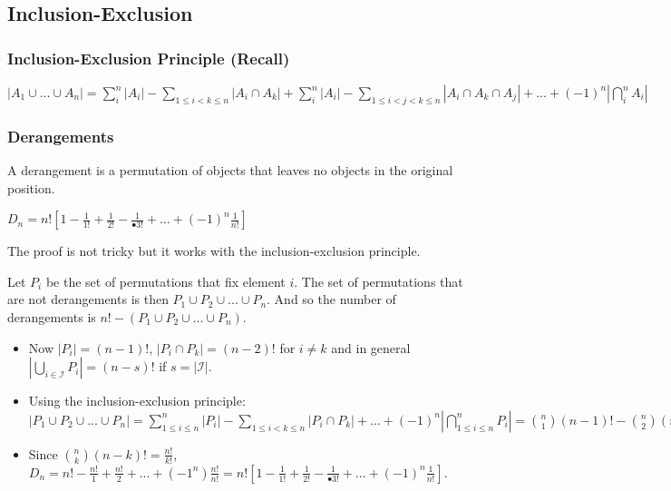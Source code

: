 \documentclass{article}
\begin{document}
\subsection{Inclusion-Exclusion}
\subsubsection{Inclusion-Exclusion Principle (Recall)}
\begin{tcolorbox}[sharp corners, colback=green!30, colframe=green!80!blue, title=Inclusion-Exclusion Principle] 
$ |A_1 \cup ... \cup A_n| = \sum_{i}^{n}|A_i| - \sum_{1 \leq i < k \leq n}|A_i \cap A_k| + \sum_{i}^{n}|A_i| - \sum_{1 \leq i < j < k \leq n}|A_i \cap A_k \cap A_j| + ... + (-1)^n |\bigcap\limits_{i}^{n}A_i| $
\end{tcolorbox}

\subsubsection{Derangements} A derangement is a permutation of objects that leaves no objects in the original position.

\begin{tcolorbox}[sharp corners, colback=green!30, colframe=green!80!blue, title=Number of Derangements with n elements]
$ D_n = n![1 - \frac{1}{1!} + \frac{1}{2!} - \frac{1}{•3!} + ... + (-1)^n\frac{1}{n!}] $
\end{tcolorbox}
The proof is not tricky but it works with the inclusion-exclusion principle.

\begin{tcolorbox}[width=12.1cm]
Let $ P_i $ be the set of permutations that fix element $ i $. The set of permutations that are not derangements is then $ P_1 \cup P_2 \cup ... \cup P_n $. And so the number of derangements is $ n! - (P_1 \cup P_2 \cup ... \cup P_n) $.
\begin{itemize}
\item Now $ |P_i| = (n-1)! $, $ |P_i \cap P_k| = (n-2)! $ for $ i \neq k $ and in general $ |\bigcup_{i \in \mathcal{I}}P_i| = (n-s)! $ if $ s = |\mathcal{I}| $.
\item Using the inclusion-exclusion principle: $ | P_1 \cup P_2 \cup ... \cup P_n | = \sum_{1 \leq i \leq n}^{n}|P_i| - \sum_{1 \leq i < k \leq n}|P_i \cap P_k| + ... + (-1)^n |\bigcap\limits_{1 \leq i \leq n}^{n}P_i| = \binom{n}{1}(n-1)! - \binom{n}{2}(n-2)! + ... + (-1)^n\binom{n}{n} $
\item Since $ \binom{n}{k}(n-k)! = \frac{n!}{k!} $, $ D_n = n! - \frac{n!}{1} + \frac{n!}{2} + ... + (-1^n)\frac{n!}{n!} = n![1 - \frac{1}{1!} + \frac{1}{2!} - \frac{1}{•3!} + ... + (-1)^n\frac{1}{n!}] $.
\end{itemize}
\end{tcolorbox}
\end{document}
